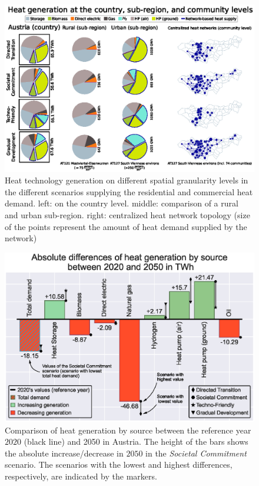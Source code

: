 \begin{figure}
	\centering
	\includegraphics[width=1\linewidth]{figures/4_Results/Fig_Matrix-plot/Spatial_results.eps}
	\caption{Heat technology generation on different spatial granularity levels in the different scenarios supplying the residential and commercial heat demand. left: on the country level. middle: comparison of a rural and urban sub-region. right: centralized heat network topology (size of the points represent the amount of heat demand supplied by the network)}
	\label{fig:res1}
\end{figure}

\begin{figure}
	\centering
	\includegraphics[width=1\linewidth]{figures/4_Results/Fig-Comp/Ref-2050.eps}
	\caption{Comparison of heat generation by source between the reference year $2020$ (black line) and 2050 in Austria. The height of the bars shows the absolute increase/decrease in $2050$ in the \textit{Societal Commitment} scenario. The scenarios with the lowest and highest differences, respectively, are indicated by the markers.}
	\label{fig:res-comp}
\end{figure}

